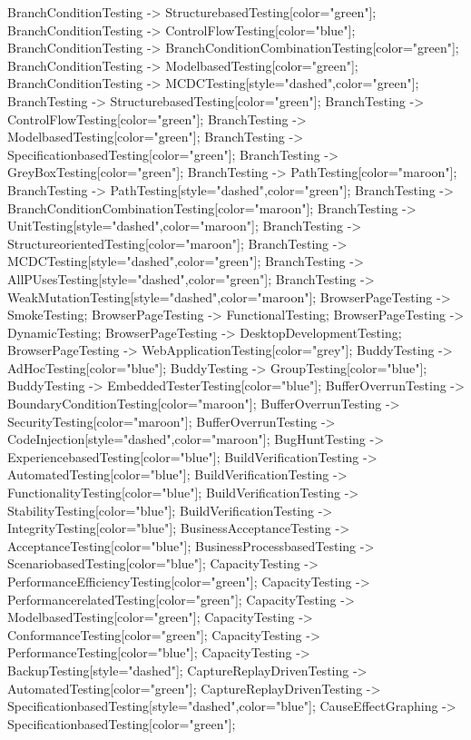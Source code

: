 \documentclass{article}
\begin{document}
{BranchConditionTesting -> StructurebasedTesting[color="green"];
BranchConditionTesting -> ControlFlowTesting[color="blue"];
BranchConditionTesting -> BranchConditionCombinationTesting[color="green"];
BranchConditionTesting -> ModelbasedTesting[color="green"];
BranchConditionTesting -> MCDCTesting[style="dashed",color="green"];
BranchTesting -> StructurebasedTesting[color="green"];
BranchTesting -> ControlFlowTesting[color="green"];
BranchTesting -> ModelbasedTesting[color="green"];
BranchTesting -> SpecificationbasedTesting[color="green"];
BranchTesting -> GreyBoxTesting[color="green"];
BranchTesting -> PathTesting[color="maroon"];
BranchTesting -> PathTesting[style="dashed",color="green"];
BranchTesting -> BranchConditionCombinationTesting[color="maroon"];
BranchTesting -> UnitTesting[style="dashed",color="maroon"];
BranchTesting -> StructureorientedTesting[color="maroon"];
BranchTesting -> MCDCTesting[style="dashed",color="green"];
BranchTesting -> AllPUsesTesting[style="dashed",color="green"];
BranchTesting -> WeakMutationTesting[style="dashed",color="maroon"];
BrowserPageTesting -> SmokeTesting;
BrowserPageTesting -> FunctionalTesting;
BrowserPageTesting -> DynamicTesting;
BrowserPageTesting -> DesktopDevelopmentTesting;
BrowserPageTesting -> WebApplicationTesting[color="grey"];
BuddyTesting -> AdHocTesting[color="blue"];
BuddyTesting -> GroupTesting[color="blue"];
BuddyTesting -> EmbeddedTesterTesting[color="blue"];
BufferOverrunTesting -> BoundaryConditionTesting[color="maroon"];
BufferOverrunTesting -> SecurityTesting[color="maroon"];
BufferOverrunTesting -> CodeInjection[style="dashed",color="maroon"];
BugHuntTesting -> ExperiencebasedTesting[color="blue"];
BuildVerificationTesting -> AutomatedTesting[color="blue"];
BuildVerificationTesting -> FunctionalityTesting[color="blue"];
BuildVerificationTesting -> StabilityTesting[color="blue"];
BuildVerificationTesting -> IntegrityTesting[color="blue"];
BusinessAcceptanceTesting -> AcceptanceTesting[color="blue"];
BusinessProcessbasedTesting -> ScenariobasedTesting[color="blue"];
CapacityTesting -> PerformanceEfficiencyTesting[color="green"];
CapacityTesting -> PerformancerelatedTesting[color="green"];
CapacityTesting -> ModelbasedTesting[color="green"];
CapacityTesting -> ConformanceTesting[color="green"];
CapacityTesting -> PerformanceTesting[color="blue"];
CapacityTesting -> BackupTesting[style="dashed"];
CaptureReplayDrivenTesting -> AutomatedTesting[color="green"];
CaptureReplayDrivenTesting -> SpecificationbasedTesting[style="dashed",color="blue"];
CauseEffectGraphing -> SpecificationbasedTesting[color="green"];
}
\end{document}
